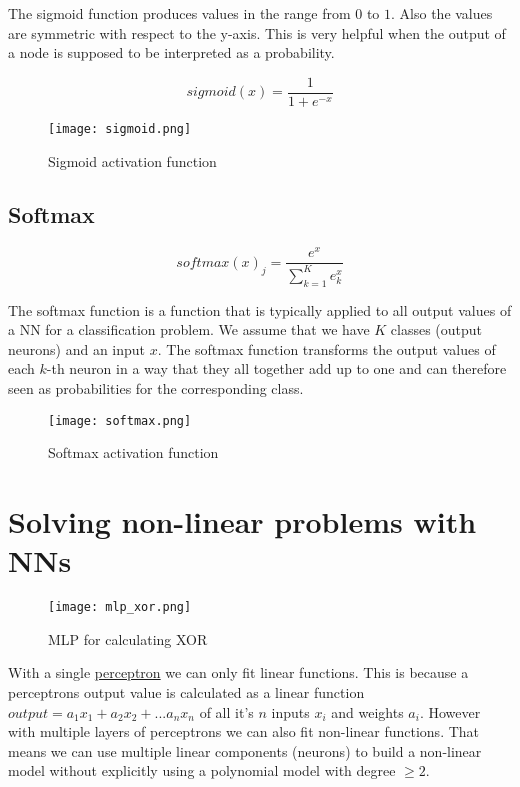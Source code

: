 The sigmoid function produces values in the range from $0$ to $1$. Also the values are symmetric with respect to the y-axis. This is very helpful when the output of a node is supposed to be interpreted as a probability.

$$
    sigmoid(x) = \frac{1}{1 + e^{-x}}
$$

\begin{figure}[h]
    \centering
    \texttt{[image: sigmoid.png]}
    \caption{Sigmoid activation function}
    \label{fig:sigmoid}
\end{figure}

\subsection{Softmax}

$$
    softmax(x)_{j} = \frac{e^{x}}{\sum_{k=1}^{K}e_{k}^{x}}
$$


The softmax function is a function that is typically applied to all output values of a NN for a classification problem. We assume that we have $K$ classes (output neurons) and an input $x$. The softmax function transforms the output values of each $k$-th neuron in a way that they all together add up to one and can therefore seen as probabilities for the corresponding class.

\begin{figure}[h]
    \centering
    \texttt{[image: softmax.png]}
    \caption{Softmax activation function}
    \label{fig:softmax}
\end{figure}

\section{Solving non-linear problems with NNs}

\label{sec:solving_non_linear_problems_with_nns}

\begin{figure}[h]
    \centering
    \texttt{[image: mlp\_xor.png]}
    \caption{MLP for calculating XOR}
    \label{fig:mlp_xor}
\end{figure}

With a single \hyperref[sec:mlp]{perceptron} we can only fit linear functions. This is because a perceptrons output value is calculated as a linear function $output = a_{1} x_{1} + a_{2} x_{2} + ... a_{n} x_{n}$ of all it's $n$ inputs $x_{i}$ and weights $a_{i}$. However with multiple layers of perceptrons we can also fit non-linear functions. That means we can use multiple linear components (neurons) to build a non-linear model without explicitly using a polynomial model with degree $\geq 2$.

